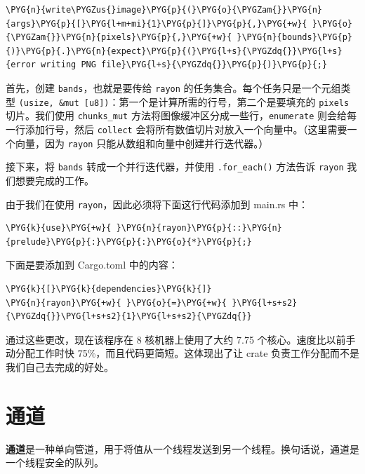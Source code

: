 \begin{Verbatim}[commandchars=\\\{\},breaklines=true,breakanywhere=true,fontsize=\codefont,xleftmargin=17bp]
\PYG{n}{write\PYGZus{}image}\PYG{p}{(}\PYG{o}{\PYGZam{}}\PYG{n}{args}\PYG{p}{[}\PYG{l+m+mi}{1}\PYG{p}{]}\PYG{p}{,}\PYG{+w}{ }\PYG{o}{\PYGZam{}}\PYG{n}{pixels}\PYG{p}{,}\PYG{+w}{ }\PYG{n}{bounds}\PYG{p}{)}\PYG{p}{.}\PYG{n}{expect}\PYG{p}{(}\PYG{l+s}{\PYGZdq{}}\PYG{l+s}{error writing PNG file}\PYG{l+s}{\PYGZdq{}}\PYG{p}{)}\PYG{p}{;}
\end{Verbatim}

首先，创建 \texttt{bands}，也就是要传给 \texttt{rayon} 的任务集合。每个任务只是一个元组类型 \texttt{(usize, \&mut [u8])}：第一个是计算所需的行号，第二个是要填充的 \texttt{pixels} 切片。我们使用 \texttt{chunks\_mut} 方法将图像缓冲区分成一些行，\texttt{enumerate} 则会给每一行添加行号，然后 \texttt{collect} 会将所有数值切片对放入一个向量中。（这里需要一个向量，因为 \texttt{rayon} 只能从数组和向量中创建并行迭代器。）

接下来，将 \texttt{bands} 转成一个并行迭代器，并使用 \texttt{.for\_each()} 方法告诉 \texttt{rayon} 我们想要完成的工作。

由于我们在使用 \texttt{rayon}，因此必须将下面这行代码添加到 main.rs 中：

\begin{Verbatim}[commandchars=\\\{\},breaklines=true,breakanywhere=true,fontsize=\codefont,xleftmargin=17bp]
\PYG{k}{use}\PYG{+w}{ }\PYG{n}{rayon}\PYG{p}{::}\PYG{n}{prelude}\PYG{p}{:}\PYG{p}{:}\PYG{o}{*}\PYG{p}{;}
\end{Verbatim}

下面是要添加到 Cargo.toml 中的内容：

\begin{Verbatim}[commandchars=\\\{\},breaklines=true,breakanywhere=true,fontsize=\codefont,xleftmargin=17bp]
\PYG{k}{[}\PYG{k}{dependencies}\PYG{k}{]}
\PYG{n}{rayon}\PYG{+w}{ }\PYG{o}{=}\PYG{+w}{ }\PYG{l+s+s2}{\PYGZdq{}}\PYG{l+s+s2}{1}\PYG{l+s+s2}{\PYGZdq{}}
\end{Verbatim}

通过这些更改，现在该程序在 8 核机器上使用了大约 7.75 个核心。速度比以前手动分配工作时快 75\%，而且代码更简短。这体现出了让 crate 负责工作分配而不是我们自己去完成的好处。

\section{通道}

\textbf{通道}是一种单向管道，用于将值从一个线程发送到另一个线程。换句话说，通道是一个线程安全的队列。

